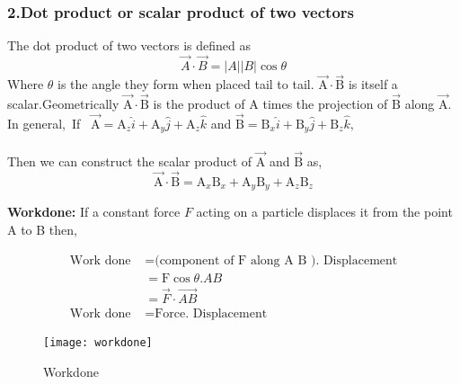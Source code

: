 \subsubsection{\large{2}.Dot product or scalar product of two vectors}
The dot product of two vectors is defined as
\begin{equation}
\vec{A} \cdot \vec{B}=|A| | B| \cos \theta
\end{equation}
Where $\theta$ is the angle they form when placed tail to tail. $\vec{\mathrm{A}} \cdot \vec{\mathrm B}$ is itself a scalar.Geometrically $\vec{\mathrm A} \cdot \vec{\mathrm B}$ is the product of $\mathrm A$ times the projection of $\vec{\mathrm B}$ along $\vec{\mathrm A}$.
\\\newline In general,\ If \ $\vec{\mathrm A}=\mathrm A_{z} \hat{i}+\mathrm A_{y} \hat{j}+\mathrm A_{z} \hat{k}$ and $\vec{\mathrm B}=\mathrm B_{x} \hat{i}+\mathrm B_{y} \hat{j}+\mathrm B_{z} \hat{k},$\\\\ Then we can construct the scalar product of $\vec{\mathrm A}$ and $\vec{\mathrm B}$ as,
\begin{equation}
\vec{\mathrm A} \cdot \vec{ \mathrm B}=\mathrm A_{x} \mathrm B_{x}+\mathrm A_{y} \mathrm B_{y}+\mathrm A_{z} \mathrm B_{z}
\end{equation}  
\begin{example}\textbf{Workdone:}
	If a constant force $F$ acting on a particle displaces it from the point A to B then,\\
	\begin{minipage}{0.45\textwidth}
		\begin{align*}
		\text{Work done} &=\text{(component of F along A B ). Displacement}\\
		&=\mathrm{F} \cos \theta . A B \\
		&=\vec{F} \cdot \overrightarrow{A B}\\
		\text{Work done }&=\text{Force. Displacement}
		\end{align*}
	\end{minipage}
	\begin{minipage}{0.45\textwidth}
	\begin{figure}[H]
		\begin{center}
			\texttt{[image: workdone]}
		\end{center}
		\caption{Workdone}
	\end{figure}
\end{minipage}
\end{example}
